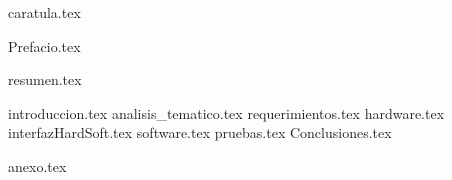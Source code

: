 \documentclass[a4paper,openany,12pt]{book}
\renewcommand{\headrulewidth}{0pt}%
\renewcommand{\headrulewidth}{0pt}
\renewcommand{\footrulewidth}{0pt}}
\begin{document}
{caratula.tex}
\clearpage
\newpage

\frontmatter

{Prefacio.tex}
\clearpage
\newpage

{resumen.tex}
\clearpage

\newpage

\tableofcontents
\clearpage
\listoftables
\clearpage
\listoffigures
\clearpage

\newpage





\pagestyle{fancy}
\setlength{\headheight}{15pt}%

\lhead[]{}
\chead[]{}
\rhead[]{}
\cfoot[]{}
\fancyhead[LO,RE]{ \leftmark}%
\renewcommand{\headrulewidth}{0pt}%
\fancyfoot[LO,RE]{\thepage}%

\fancypagestyle{plain}{%
\fancyhf{} 
\fancyfoot[LO,RE]{\thepage}
\renewcommand{\headrulewidth}{0pt}
\renewcommand{\footrulewidth}{0pt}}


\mainmatter

{introduccion.tex}
\clearpage
{analisis_tematico.tex}
\clearpage
{requerimientos.tex}
\clearpage
{hardware.tex}
\clearpage
{interfazHardSoft.tex}
\clearpage
{software.tex}
\clearpage
{pruebas.tex}
\clearpage
{Conclusiones.tex}
\clearpage



\printglossary
\clearpage
{} %

\nocite{*}


\clearpage

{anexo.tex}
\end{document}
